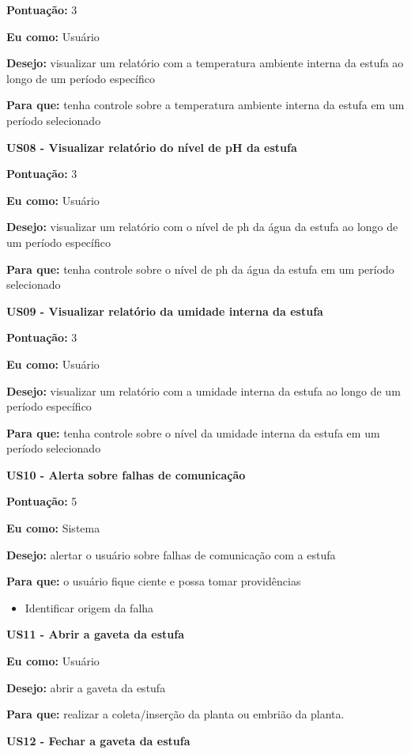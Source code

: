 \textbf{Pontuação:} 3

\textbf{Eu como:} Usuário

\textbf{Desejo:} visualizar um relatório com a temperatura ambiente interna da estufa ao longo de um período específico

\textbf{Para que:} tenha controle sobre a temperatura ambiente interna da estufa em um período selecionado


\textbf{US08 - Visualizar relatório do nível de pH da estufa}

\textbf{Pontuação:} 3

\textbf{Eu como:} Usuário

\textbf{Desejo:} visualizar um relatório com o nível de ph da água da estufa ao longo de um período específico

\textbf{Para que:} tenha controle sobre o nível de ph da água da estufa em um período selecionado


\textbf{US09 - Visualizar relatório da umidade interna da estufa}

\textbf{Pontuação:} 3

\textbf{Eu como:} Usuário

\textbf{Desejo:} visualizar um relatório com a umidade interna da estufa ao longo de um período específico

\textbf{Para que:} tenha controle sobre o nível da umidade interna da estufa em um período selecionado


\textbf{US10 - Alerta sobre falhas de comunicação}

\textbf{Pontuação:} 5

\textbf{Eu como:} Sistema

\textbf{Desejo:} alertar o usuário sobre falhas de comunicação com a estufa

\textbf{Para que:} o usuário fique ciente e possa tomar providências

\begin{itemize}
	\item Identificar origem da falha
	
\end{itemize}

\textbf{US11 - Abrir a gaveta da estufa}

\textbf{Eu como:} Usuário

\textbf{Desejo:} abrir a gaveta da estufa

\textbf{Para que:} realizar a coleta/inserção da planta ou embrião da planta.

\textbf{US12 - Fechar a gaveta da estufa}
	
